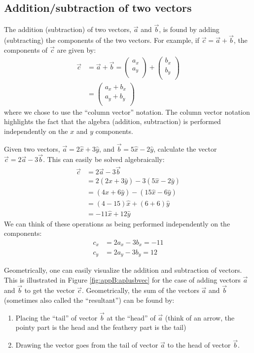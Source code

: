 \subsection{Addition/subtraction of two vectors}
The addition (subtraction) of two vectors, $\vec a$ and $\vec b$, is found by adding (subtracting) the components of the two vectors. For example, if $\vec c=\vec a+\vec b$, the components of $\vec c$ are given by:
\begin{align*}
\vec c &= \vec a + \vec b = \begin{pmatrix}
           a_x \\
           a_y \\
         \end{pmatrix} + \begin{pmatrix}
           b_x \\
           b_y \\
         \end{pmatrix}\\
         &=\begin{pmatrix}
           a_x+b_x \\
           a_y+b_y \\
         \end{pmatrix}
\end{align*}
where we chose to use the ``column vector'' notation. The column vector notation highlights the fact that the algebra (addition, subtraction) is performed independently on the $x$ and $y$ components. 
\begin{example}{Given two vectors, $\vec a=2\hat x+3\hat y$, and $\vec b=5\hat x-2\hat y$, calculate the vector $\vec c= 2\vec a- 3\vec b$.}
This can easily be solved algebraically:
\begin{align*}
\vec c &= 2\vec a- 3\vec b\\
&=2 (2\hat x+3\hat y) - 3 (5\hat x-2\hat y) \\
&=(4\hat x+6\hat y)-(15\hat x-6\hat y) \\
&=(4-15)\hat x + (6+6) \hat y\\
&= -11 \hat x + 12 \hat y
\end{align*}
We can think of these operations as being performed independently on the components:
\begin{align*}
c_x&=2a_x-3b_x=-11\\
c_y&=2a_y-3b_y=12
\end{align*} 
\end{example}

Geometrically, one can easily visualize the addition and subtraction of vectors. This is illustrated in Figure \ref{fig:appB:aplusbvec} for the case of adding vectors $\vec a$ and $\vec b$ to get the vector $\vec c$. Geometrically, the sum of the vectors $\vec a$ and $\vec b$ (sometimes also called the ``resultant'') can be found by:
\begin{enumerate}
\item Placing the ``tail'' of vector $\vec b$ at the ``head'' of $\vec a$ (think of an arrow, the pointy part is the head and the feathery part is the tail)
\item Drawing the vector goes from the tail of vector $\vec a$ to the head of vector $\vec b$.
\end{enumerate}

